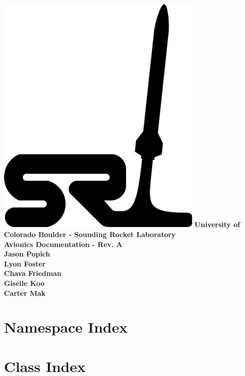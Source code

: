 \let\mypdfximage\pdfximage\def\pdfximage{\immediate\mypdfximage}\documentclass[twoside]{book}
\newcommand{\+}{\discretionary{\mbox{\scriptsize$\hookleftarrow$}}{}{}}
\newcommand{\clearemptydoublepage}{%
  \newpage{\pagestyle{empty}\cleardoublepage}%
}
\begin{document}
\hypersetup{pageanchor=false,
             bookmarksnumbered=true,
             pdfencoding=unicode
            }
\begin{titlepage}
    \centering
    \includegraphics[width=10cm]{SRL_Stylized.png} %
    \vfill
    {\bfseries\Large
        University of Colorado Boulder - Sounding Rocket Laboratory\\
        Avionics Documentation - Rev. A\\
        \bfseries\large
        \vskip2cm
        Jason Popich\\
        Lyon Foster\\
        Chava Friedman\\
        Giselle Koo\\
        Carter Mak\\
    }
    \vfill
    \vfill
\end{titlepage}
\clearemptydoublepage
{}
\tableofcontents
\clearemptydoublepage
{}
\hypersetup{pageanchor=true}

\chapter{Namespace Index}

\chapter{Class Index}

\end{document}
